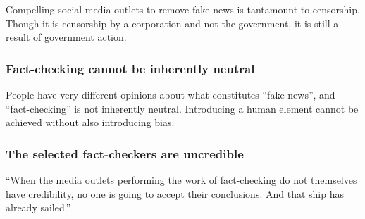 Compelling social media outlets to remove fake news is tantamount to censorship. Though it is censorship by a corporation and not the government, it is still a result of government action. \cite{wp_germany_fake_news_law}


\subsubsection{Fact-checking cannot be inherently neutral}

People have very different opinions about what constitutes ``fake news'', and ``fact-checking'' is not inherently neutral. Introducing a human element cannot be achieved without also introducing bias. \cite{vox_sentences_fn} \cite{inc_fb_transparency}

\subsubsection{The selected fact-checkers are uncredible}

``When the media outlets performing the work of fact-checking do not themselves have credibility, no one is going to accept their conclusions. And that ship has already sailed.'' \cite{vox_sentences_fn}

